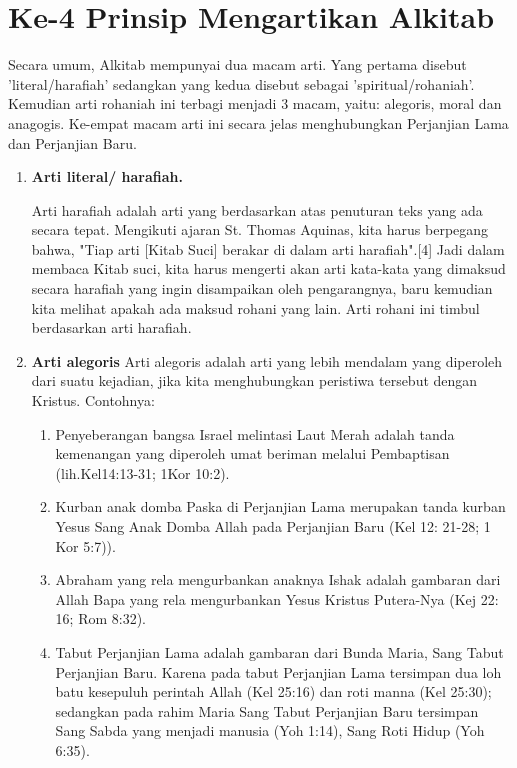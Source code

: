 \section*{Ke-4 Prinsip Mengartikan Alkitab}
Secara umum, Alkitab mempunyai dua macam arti. Yang pertama disebut 'literal/harafiah' sedangkan yang kedua disebut sebagai 'spiritual/rohaniah'. Kemudian arti rohaniah ini terbagi menjadi 3 macam, yaitu: alegoris, moral dan anagogis. Ke-empat macam arti ini secara jelas menghubungkan Perjanjian Lama dan Perjanjian Baru.
\begin{enumerate}
\item \textbf{Arti literal/ harafiah.}

Arti harafiah adalah arti yang berdasarkan atas penuturan teks yang ada secara tepat. Mengikuti ajaran St. Thomas Aquinas, kita harus berpegang bahwa, "Tiap arti [Kitab Suci] berakar di dalam arti harafiah".[4] Jadi dalam membaca Kitab suci, kita harus mengerti akan arti kata-kata yang dimaksud secara harafiah yang ingin disampaikan oleh pengarangnya, baru kemudian kita melihat apakah ada maksud rohani yang lain. Arti rohani ini timbul berdasarkan arti harafiah.

\item \textbf{Arti alegoris}
Arti alegoris adalah arti yang lebih mendalam yang diperoleh dari suatu kejadian, jika kita menghubungkan peristiwa tersebut dengan Kristus. Contohnya:
\begin{enumerate}
\item Penyeberangan bangsa Israel melintasi Laut Merah adalah tanda kemenangan yang diperoleh umat beriman melalui Pembaptisan (lih.Kel14:13-31; 1Kor 10:2).
\item Kurban anak domba Paska di Perjanjian Lama merupakan tanda kurban Yesus Sang Anak Domba Allah pada Perjanjian Baru (Kel 12: 21-28; 1 Kor 5:7)).
\item Abraham yang rela mengurbankan anaknya Ishak adalah gambaran dari Allah Bapa yang rela mengurbankan Yesus Kristus Putera-Nya (Kej 22: 16; Rom 8:32).
\item Tabut Perjanjian Lama adalah gambaran dari Bunda Maria, Sang Tabut Perjanjian Baru. Karena pada tabut Perjanjian Lama tersimpan dua loh batu kesepuluh perintah Allah (Kel 25:16) dan roti manna (Kel 25:30); sedangkan pada rahim Maria Sang Tabut Perjanjian Baru tersimpan Sang Sabda yang menjadi manusia (Yoh 1:14), Sang Roti Hidup (Yoh 6:35).
\end{enumerate}


\end{enumerate}

